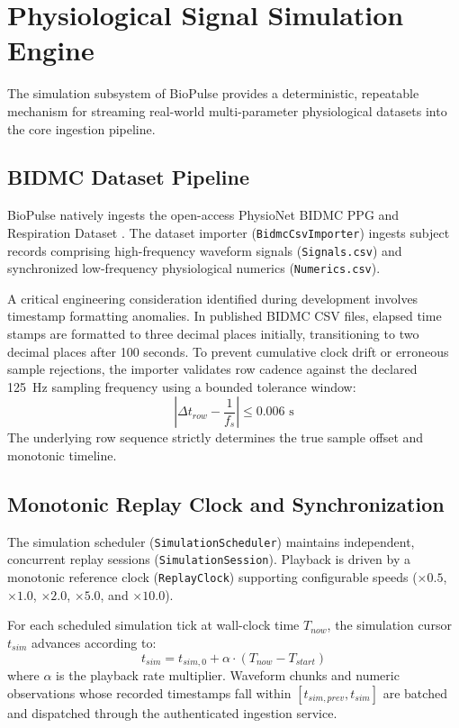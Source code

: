 \documentclass[10pt,journal,compsoc]{IEEEtran}
\begin{document}
\section{Physiological Signal Simulation Engine}
\label{sec:simulation}

The simulation subsystem of BioPulse provides a deterministic, repeatable mechanism for streaming real-world multi-parameter physiological datasets into the core ingestion pipeline.

\subsection{BIDMC Dataset Pipeline}
BioPulse natively ingests the open-access PhysioNet BIDMC PPG and Respiration Dataset \cite{pimentel2016robust}. The dataset importer (\texttt{BidmcCsvImporter}) ingests subject records comprising high-frequency waveform signals (\texttt{Signals.csv}) and synchronized low-frequency physiological numerics (\texttt{Numerics.csv}).

A critical engineering consideration identified during development involves timestamp formatting anomalies. In published BIDMC CSV files, elapsed time stamps are formatted to three decimal places initially, transitioning to two decimal places after 100 seconds. To prevent cumulative clock drift or erroneous sample rejections, the importer validates row cadence against the declared 125~Hz sampling frequency using a bounded tolerance window:
\begin{equation}
\left| \Delta t_{row} - \frac{1}{f_s} \right| \le 0.006\text{ s}
\end{equation}
The underlying row sequence strictly determines the true sample offset and monotonic timeline.

\subsection{Monotonic Replay Clock and Synchronization}
The simulation scheduler (\texttt{SimulationScheduler}) maintains independent, concurrent replay sessions (\texttt{SimulationSession}). Playback is driven by a monotonic reference clock (\texttt{ReplayClock}) supporting configurable speeds ($\times 0.5$, $\times 1.0$, $\times 2.0$, $\times 5.0$, and $\times 10.0$). 

For each scheduled simulation tick at wall-clock time $T_{now}$, the simulation cursor $t_{sim}$ advances according to:
\begin{equation}
t_{sim} = t_{sim,0} + \alpha \cdot (T_{now} - T_{start})
\end{equation}
where $\alpha$ is the playback rate multiplier. Waveform chunks and numeric observations whose recorded timestamps fall within $[t_{sim, prev}, t_{sim}]$ are batched and dispatched through the authenticated ingestion service.
\end{document}
